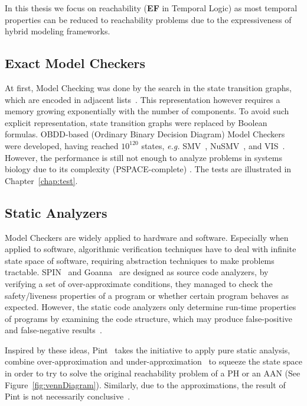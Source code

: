 In this thesis we focus on reachability (\textbf{EF} in Temporal Logic) as most temporal properties can be reduced to reachability problems due to the expressiveness of hybrid modeling frameworks.

\subsection{Exact Model Checkers}
At first, Model Checking was done by the search in the state transition graphs, which are encoded in adjacent lists~\cite{clarke1981design}.
This representation however requires a memory growing exponentially with the number of components.
To avoid such explicit representation, state transition graphs were replaced by Boolean formulas.
OBDD-based (Ordinary Binary Decision Diagram) Model Checkers were developed, having reached $10^{120}$ states, \textit{e.g.}
SMV~\cite{mcmillan1993symbolic}, NuSMV~\cite{cimatti2000nusmv}, and VIS~\cite{brayton1996vis}.
However, the performance is still not enough to analyze problems in systems biology due to its complexity (PSPACE-complete) \cite{harel2002complexity}.
The tests are illustrated in Chapter~\ref{chap:test}.  

\subsection{Static Analyzers}
Model Checkers are widely applied to hardware and software.
Especially when applied to software, algorithmic verification techniques have
to deal with %
infinite state space of software, requiring abstraction techniques to make problems tractable.
SPIN~\cite{holzmann1997model} and Goanna~\cite{fehnker2006goanna} are designed as source code analyzers, by verifying a set of over-approximate conditions, they managed to check the safety/liveness properties of a program or whether certain program behaves as expected. 
However, the static code analyzers only determine run-time properties of programs by examining the code structure, which may produce false-positive and false-negative results~\cite{vorobyov2010comparing}.

Inspired by these ideas, Pint~\cite{Pint} takes the initiative to apply pure static analysis, combine over-approximation and under-approximation~\cite{pauleve2012} to squeeze the state space in order to try to solve the original reachability problem of a PH or an AAN (See Figure~\ref{fig:vennDiagram}).
Similarly, due to the approximations, the result of Pint is not necessarily conclusive~\cite{folschette2015}.

